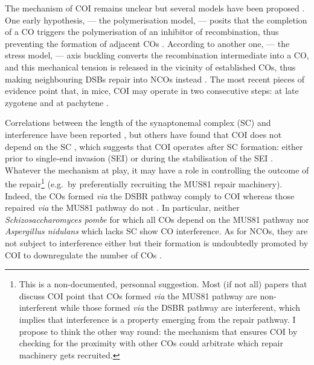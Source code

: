 The mechanism of COI remains unclear but several models have been proposed \citep[reviewed in][]{youds2011choice}.
One early hypothesis, — the polymerisation model, — posits that the completion of a CO triggers the polymerisation of an inhibitor of recombination, thus preventing the formation of adjacent COs \citep{maguire1988crossover,king1990polymerization}.
According to another one, — the stress model, — axis buckling converts the recombination intermediate into a CO, and this mechanical tension is released in the vicinity of established COs, thus making neighbouring DSBs repair into NCOs instead \citep{borner2004crossover,kleckner2004mechanical}.
The most recent pieces of evidence point that, in mice, COI may operate in two consecutive steps: at late zygotene and at pachytene \citep{boer2006two}.

Correlations between the length of the synaptonemal complex (SC) and interference have been reported \citep{sym1994crossover,lynn2002covariation,petkov2007crossover}, but others have found that COI does not depend on the SC \citep{deboer2007meiotic,shodhan2014msh4}, which suggests that COI operates after SC formation: either prior to single-end invasion (SEI) \citep{hunter2001singleend, bishop2004early} or during the stabilisation of the SEI \citep{shinohara2008crossover}.\\

Whatever the mechanism at play, it may have a role in controlling the outcome of the repair\footnote{This is a non-documented, personnal suggestion. Most (if not all) papers that discuss COI point that COs formed \textit{via} the MUS81 pathway are non-interferent while those formed \textit{via} the DSBR pathway are interferent, which implies that interference is a property emerging from the repair pathway. I propose to think the other way round: the mechanism that ensures COI by checking for the proximity with other COs could arbitrate which repair machinery gets recruited.} (e.g.\ by preferentially recruiting the MUS81 repair machinery).
Indeed, the COs formed \textit{via} the DSBR pathway comply to COI whereas those repaired \textit{via} the MUS81 pathway do not \citep{santos2003mus81,kohl2013meiotic}.
In particular, neither \textit{Schizosaccharomyces pombe} for which all COs depend on the MUS81 pathway \citep{munz1994analysis,hollingsworth2004mus81,cromie2006single} nor \textit{Aspergillus nidulans} which lacks SC \citep[reviewed in \citealp{shaw1998meiosis} and \citealp{egel1995synaptonemal}]{strickland1958analysis} show CO interference.
As for NCOs, they are not subject to interference either \citep{malkova2004gene,baudat2007regulating,miller2016wholegenome} but their formation is undoubtedly promoted by COI to downregulate the number of COs \citep{rockmill2003sgs1,youds2010rtel1,crismani2012fancm,seguela-arnaud2015multiple}.



